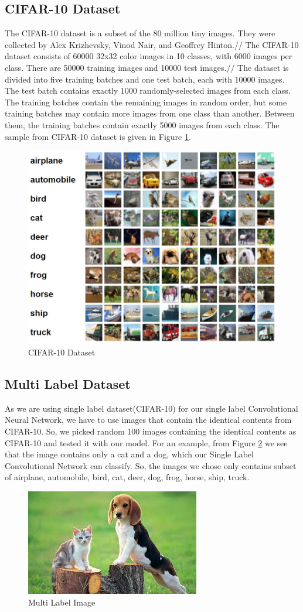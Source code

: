\subsection{CIFAR-10 Dataset}
The CIFAR-10 dataset is a subset of the 80 million tiny images. They were collected by Alex Krizhevsky, Vinod Nair, and Geoffrey Hinton.//
The CIFAR-10 dataset consists of 60000 32x32 color images in 10 classes, with 6000 images per class. There are 50000 training images and 10000 test images.//
The dataset is divided into five training batches and one test batch, each with 10000 images. The test batch contains exactly 1000 randomly-selected images from each class. The training batches contain the remaining images in random order, but some training batches may contain more images from one class than another. Between them, the training batches contain exactly 5000 images from each class. The sample from CIFAR-10 dataset is given in Figure \ref{cifar10}.

\begin{figure}[h!]
  \centering
  \includegraphics[width=.4\textwidth]{images/cifar10.JPG}
  \caption{CIFAR-10 Dataset} \label{cifar10}
  \vspace{-.5cm}
\end{figure}

\subsection{Multi Label Dataset}
As we are using single label dataset(CIFAR-10) for our single label Convolutional Neural Network, we have to use images that contain the identical contents from CIFAR-10. So, we picked random 100 images containing the identical contents as CIFAR-10 and tested it with our model. For an example, from Figure \ref{multi} we see that the image contains only a cat and a  dog, which our Single Label Convolutional Network can classify. So, the images we chose only contains subset of airplane, automobile, bird, cat, deer, dog, frog, horse, ship, truck.  

\begin{figure}[h!]
  \centering
  \includegraphics[width=.3\textwidth]{images/multi.jpg}
  \caption{Multi Label Image} \label{multi}
  \vspace{-.5cm}
\end{figure}